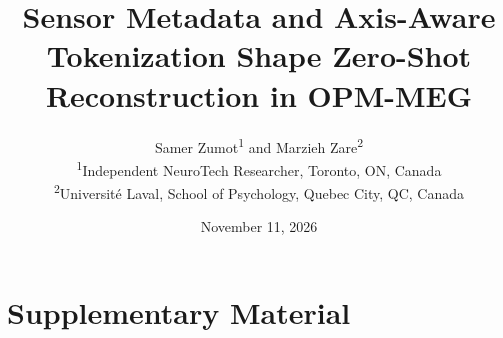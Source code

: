 \documentclass[11pt,letterpaper]{article}
\title{Sensor Metadata and Axis-Aware Tokenization Shape Zero-Shot Reconstruction in OPM-MEG}
\author{Samer Zumot\textsuperscript{1} and Marzieh Zare\textsuperscript{2}\\[0.5em]
\small\textsuperscript{1}Independent NeuroTech Researcher, Toronto, ON, Canada\\
\small\textsuperscript{2}Universit\'e Laval, School of Psychology, Quebec City, QC, Canada}
\date{November 11, 2026}
\begin{document}
\maketitle

\FloatBarrier


\clearpage
\appendix
\setcounter{section}{0}
\setcounter{table}{0}
\renewcommand{\thesection}{S\arabic{section}}
\renewcommand{\thetable}{S\arabic{table}}
\renewcommand{\theHtable}{supp.\arabic{table}}
\section*{Supplementary Material}
\setlength{\tabcolsep}{5pt}

\end{document}
